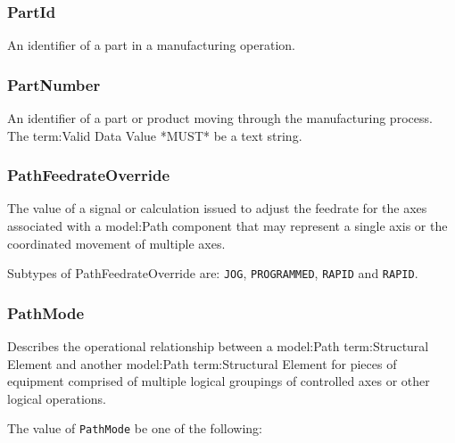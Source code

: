 \subsubsection{PartId}
  \label{sec:PartId}


An identifier of a part in a manufacturing operation.

\FloatBarrier

\subsubsection{PartNumber}
  \label{sec:PartNumber}


An identifier of a part or product moving through the manufacturing process. 
 The {term:Valid Data Value} *MUST* be a text string. 

\FloatBarrier

\subsubsection{PathFeedrateOverride}
  \label{sec:PathFeedrateOverride}


The value of a signal or calculation issued to adjust the feedrate for the axes associated with a {model:Path} component that may represent a single axis or the coordinated movement of multiple axes.


Subtypes of PathFeedrateOverride are: \texttt{JOG}, \texttt{PROGRAMMED}, \texttt{RAPID} and \texttt{RAPID}. 
\FloatBarrier

\subsubsection{PathMode}
  \label{sec:PathMode}


Describes the operational relationship between a {model:Path} {term:Structural Element} and another {model:Path} {term:Structural Element} for pieces of equipment comprised of multiple logical groupings of controlled axes or other logical operations.


The value of \texttt{PathMode} \MUST be one of the following: 

